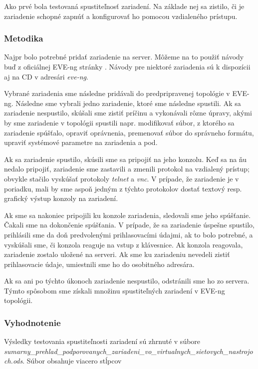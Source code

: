 Ako prvé bola testovaná spustiteľnosť zariadení. Na základe nej sa zistilo, či je zariadenie schopné zapnúť a konfigurovať ho pomocou vzdialeného prístupu.



\subsubsection{Metodika}

Najpr bolo potrebné pridať zariadenie na server. Môžeme na to použiť návody buď z oficiálnej EVE-ng stránky \cite{eve_ng_howtos}. Návody pre niektoré zariadenia sú k dispozícii aj na CD v adresári \emph{eve-ng}.

Vybrané zariadenia sme následne pridávali do predpripravenej topológie v EVE-ng. Následne sme vybrali jedno zariadenie, ktoré sme následne spustili. Ak sa zariadenie nespustilo, skúšali sme zistiť príčinu a vykonávali rôzne úpravy, akými by sme zariadenie v topológii spustili napr. modifikovať súbor, z ktorého sa zariadenie spúšťalo, opraviť oprávnenia, premenovať súbor do správneho formátu, upraviť systémové parametre na zariadenia a pod.

Ak sa zariadenie spustilo, skúsili sme sa pripojiť na jeho konzolu. Keď sa na ňu nedalo pripojiť, zariadenie sme zastavili a zmenili protokol na vzdialený prístup; obvykle stačilo vyskúšať protokoly \emph{telnet} a \emph{vnc}. V prípade, že zariadenie je v poriadku, mali by sme aspoň jedným z týchto protokolov dostať textový resp. grafický výstup konzoly na zariadení.

Ak sme sa nakoniec pripojili ku konzole zariadenia, sledovali sme jeho spúšťanie. Čakali sme na dokončenie spúšťania. V prípade, že sa zariadenie úspešne spustilo, prihlásili sme da doň predvolenými prihlasovacími údajmi, ak to bolo potrebné, a vyskúšali sme, či konzola reaguje na vstup z klávesnice. Ak konzola reagovala, zariadenie zostalo uložené na serveri. Ak sme ku zariadeniu nevedeli zistiť prihlasovacie údaje, umiestnili sme ho do osobitného adresára.

Ak sa ani po týchto úkonoch zariadenie nespustilo, odstránili sme ho zo servera. Týmto spôsobom sme získali množinu spustiteľných zariadení v EVE-ng topológii.

\subsubsection{Vyhodnotenie}

Výsledky testovania spustiteľnosti zariadení sú zhrnuté v súbore \emph{sumarny\_prehlad\_podporovanych\_zariadeni\_vo\_virtualnych\_sietovych\_nastrojoch.ods}. Súbor obsahuje viacero stĺpcov


